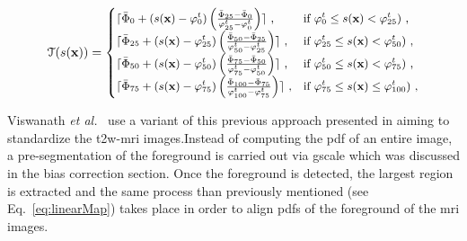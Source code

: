 \begin{equation}
\small
\mathcal{T}(s(\mathbf{x})) =
  \begin{cases}
    \lceil \bar{\Phi}_{0}+( s(\mathbf{x}) - \varphi_{0}^{t} ) \left( \frac{\bar{\Phi}_{25} - \bar{\Phi}_{0}}{\varphi_{25}^{t} - \varphi_{0}^{t}} \right) \rceil \ , & \text{if $\varphi_{0}^{t} \leq s(\mathbf{x})<\varphi_{25}^{t})$} \ , \\
    \lceil \bar{\Phi}_{25}+( s(\mathbf{x}) - \varphi_{25}^{t} ) \left( \frac{\bar{\Phi}_{50} - \bar{\Phi}_{25}}{\varphi_{50}^{t} - \varphi_{25}^{t}} \right) \rceil \ , & \text{if $\varphi_{25}^{t} \leq s(\mathbf{x})<\varphi_{50}^{t})$} \ , \\
    \lceil \bar{\Phi}_{50}+( s(\mathbf{x}) - \varphi_{50}^{t} ) \left( \frac{\bar{\Phi}_{75} - \bar{\Phi}_{50}}{\varphi_{75}^{t} - \varphi_{50}^{t}} \right) \rceil \ , & \text{if $\varphi_{50}^{t} \leq s(\mathbf{x})<\varphi_{75}^{t})$} \ , \\
    \lceil \bar{\Phi}_{75}+( s(\mathbf{x}) - \varphi_{75}^{t} ) \left( \frac{\bar{\Phi}_{100} - \bar{\Phi}_{75}}{\varphi_{100}^{t} - \varphi_{75}^{t}} \right) \rceil \ , & \text{if $\varphi_{75}^{t} \leq s(\mathbf{x})\leq \varphi_{100}^{t})$} \ ,
  \end{cases}
  \label{eq:linearMap}
\end{equation}

Viswanath \textit{et al.}~\cite{Viswanath2009,Viswanath2011,Viswanath2012} use a variant of this previous approach presented in \cite{Madabhushi2006a} aiming to standardize the \ac{t2w}-\ac{mri} images.Instead of computing the \ac{pdf} of an entire image, a pre-segmentation of the foreground is carried out via \ac{gscale} which was discussed in the bias correction section.
Once the foreground is detected, the largest region is extracted and the same process than previously mentioned (see Eq.~\eqref{eq:linearMap}) takes place in order to align \acp{pdf} of the foreground of the \ac{mri} images.

